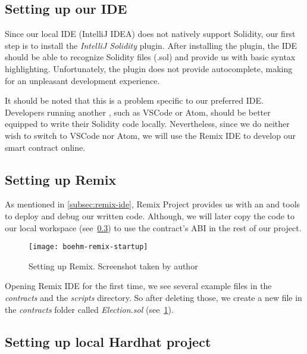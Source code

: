 \subsection{Setting up our IDE}\label{subsec:setting-up-our-ide}

Since our local \gls{IDE} (IntelliJ IDEA) does not natively support Solidity, our first step is to install the \emph{IntelliJ Solidity} plugin.
After installing the plugin, the \gls{IDE} should be able to recognize Solidity files (.sol) and provide us with basic syntax highlighting.
Unfortunately, the plugin does not provide autocomplete, making for an unpleasant development experience.

It should be noted that this is a problem specific to our preferred \gls{IDE}.
Developers running another , such as VSCode or Atom, should be better equipped to write their Solidity code locally.
Nevertheless, since we do neither wish to switch to VSCode nor Atom, we will use the Remix \gls{IDE} to develop our smart contract online.

\subsection{Setting up Remix}\label{subsec:setting-up-remix}

As mentioned in \cref{subsec:remix-ide}, Remix Project provides us with an  and tools to deploy and debug our written code.
Although, we will later copy the code to our local workspace (see~\cref{subsec:setting-up-local-hardhat-project}) to use the contract's \gls{ABI} in the rest of our project.

\begin{figure}[h]
    \centering
    \texttt{[image: boehm-remix-startup]}
    \caption[Setting up Remix]{Setting up Remix. Screenshot taken by author}
    \label{fig:remix-setup}
\end{figure}

Opening Remix \gls{IDE} for the first time, we see several example files in the \emph{contracts} and the \emph{scripts} directory.
So after deleting those, we create a new file in the \emph{contracts} folder called \emph{Election.sol} (see~\cref{fig:remix-setup}).

\subsection{Setting up local Hardhat project}\label{subsec:setting-up-local-hardhat-project}

